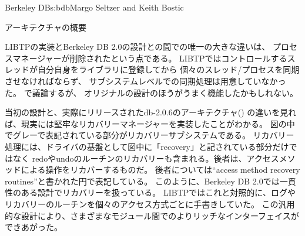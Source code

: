 \begin{aosachapter}{Berkeley DB}{s:bdb}{Margo Seltzer and Keith Bostic}
\begin{aosasect1}{アーキテクチャの概要}


LIBTPの実装とBerkeley DB 2.0の設計との間での唯一の大きな違いは、
プロセスマネージャーが削除されたという点である。
LIBTPではコントロールするスレッドが自分自身をライブラリに登録してから
個々のスレッド/プロセスを同期させなければならず、
サブシステムレベルでの同期処理は用意していなかった。
で議論するが、
オリジナルの設計のほうがうまく機能したかもしれない。


当初の設計と、実際にリリースされたdb-2.0.6のアーキテクチャ()
の違いを見れば、現実には堅牢なリカバリーマネージャーを実装したことがわかる。
図の中でグレーで表記されている部分がリカバリーサブシステムである。
リカバリー処理には、ドライバの基盤として図中に「recovery」と記されている部分だけではなく
redoやundoのルーチンのリカバリーも含まれる。後者は、アクセスメソッドによる操作をリカバーするものだ。
後者については``access method recovery routines''と書かれた円で表記している。
このように、Berkeley DB 2.0では一貫性のある設計でリカバリーを扱っている。
LIBTPではこれと対照的に、ログやリカバリーのルーチンを個々のアクセス方式ごとに手書きしていた。
この汎用的な設計により、さまざまなモジュール間でのよりリッチなインターフェイスができあがった。


\end{aosasect1}
\end{aosachapter}
